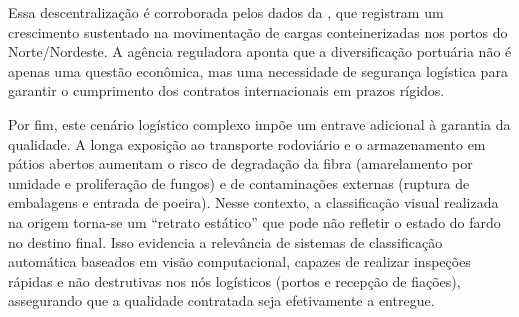         Essa descentralização é corroborada pelos dados da , que registram um crescimento sustentado na movimentação de cargas conteinerizadas nos portos do Norte/Nordeste. A agência reguladora aponta que a diversificação portuária não é apenas uma questão econômica, mas uma necessidade de segurança logística para garantir o cumprimento dos contratos internacionais em prazos rígidos.

        Por fim, este cenário logístico complexo impõe um entrave adicional à garantia da qualidade. A longa exposição ao transporte rodoviário e o armazenamento em pátios abertos aumentam o risco de degradação da fibra (amarelamento por umidade e proliferação de fungos) e de contaminações externas (ruptura de embalagens e entrada de poeira). Nesse contexto, a classificação visual realizada na origem torna-se um ``retrato estático'' que pode não refletir o estado do fardo no destino final. Isso evidencia a relevância de sistemas de classificação automática baseados em visão computacional, capazes de realizar inspeções rápidas e não destrutivas nos nós logísticos (portos e recepção de fiações), assegurando que a qualidade contratada seja efetivamente a entregue.

